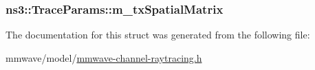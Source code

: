 \subsubsection[{\texorpdfstring{m\+\_\+tx\+Spatial\+Matrix}{m_txSpatialMatrix}}]{ ns3\+::\+Trace\+Params\+::m\+\_\+tx\+Spatial\+Matrix}\hypertarget{structns3_1_1TraceParams_a13fa4e06994006f3034833a6179f42ea}{}\label{structns3_1_1TraceParams_a13fa4e06994006f3034833a6179f42ea}


The documentation for this struct was generated from the following file\+:\begin{DoxyCompactItemize}
\item 
mmwave/model/\hyperlink{mmwave-channel-raytracing_8h}{mmwave-\/channel-\/raytracing.\+h}\end{DoxyCompactItemize}
